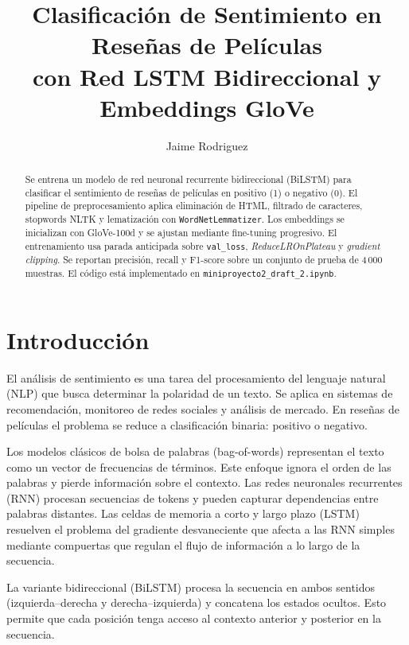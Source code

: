 \documentclass[letterpaper, 10 pt, conference]{ieeeconf}
\title{\LARGE \bf
Clasificaci\'on de Sentimiento en Rese\~nas de Pel\'iculas\\
con Red LSTM Bidireccional y Embeddings GloVe
}
\author{Jaime Rodriguez}
\begin{document}
\maketitle
\thispagestyle{empty}
\pagestyle{empty}

\begin{abstract}
Se entrena un modelo de red neuronal recurrente bidireccional (BiLSTM) para
clasificar el sentimiento de rese\~nas de pel\'iculas en positivo (1) o
negativo (0). El pipeline de preprocesamiento aplica eliminaci\'on de HTML,
filtrado de caracteres, stopwords NLTK y lematizaci\'on con
\texttt{WordNetLemmatizer}. Los embeddings se inicializan con GloVe-100d y
se ajustan mediante fine-tuning progresivo. El entrenamiento usa parada
anticipada sobre \texttt{val\_loss}, \textit{ReduceLROnPlateau} y
\textit{gradient clipping}. Se reportan precisi\'on, recall y F1-score sobre
un conjunto de prueba de 4\,000 muestras. El c\'odigo est\'a implementado en
\texttt{miniproyecto2\_draft\_2.ipynb}.
\end{abstract}

\section{Introducci\'on}

El an\'alisis de sentimiento es una tarea del procesamiento del lenguaje
natural (NLP) que busca determinar la polaridad de un texto. Se aplica en
sistemas de recomendaci\'on, monitoreo de redes sociales y an\'alisis de
mercado. En rese\~nas de pel\'iculas el problema se reduce a clasificaci\'on
binaria: positivo o negativo.

Los modelos cl\'asicos de bolsa de palabras (bag-of-words) representan el
texto como un vector de frecuencias de t\'erminos. Este enfoque ignora el
orden de las palabras y pierde informaci\'on sobre el contexto. Las redes
neuronales recurrentes (RNN) procesan secuencias de tokens y pueden capturar
dependencias entre palabras distantes. Las celdas de memoria a corto y largo
plazo (LSTM) \cite{hochreiter1997} resuelven el problema del gradiente
desvaneciente que afecta a las RNN simples mediante compuertas que regulan
el flujo de informaci\'on a lo largo de la secuencia.

La variante bidireccional (BiLSTM) procesa la secuencia en ambos sentidos
(izquierda--derecha y derecha--izquierda) y concatena los estados ocultos.
Esto permite que cada posici\'on tenga acceso al contexto anterior y
posterior en la secuencia.
\end{document}
